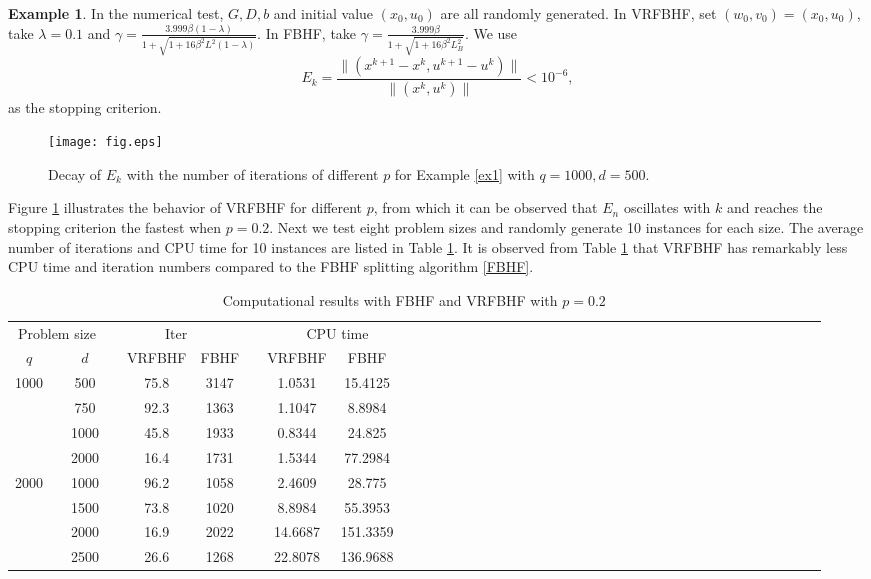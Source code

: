 \documentclass[a4paper,12pt]{article}
\theoremstyle{definition}
\newtheorem{exm}[dfn]{Example}
\begin{document}
\begin{exm}
In the numerical test,  $G,D,b$ and initial value $(x_{0},u_{0})$  are all randomly generated. In VRFBHF, set  $(w_{0},v_{0})=(x_{0},u_{0})$, take $\lambda=0.1$ and $\gamma=\frac{3.999\beta(1-\lambda)}{1+\sqrt{1+16 \beta^2L^2(1-\lambda)}}$. In FBHF, take $\gamma =\frac{3.999 \beta}{1+\sqrt{1+16\beta^2L_B^2}}$. We use
$$
E_k=\frac{\|(x^{k+1}-x^k,u^{k+1}-u^k)\|}{\|(x^k,u^k)\|}<10^{-6},
$$
as the stopping criterion.

\begin{figure}[!h]
\centering
\texttt{[image: fig.eps]}
\caption{Decay of $E_k$ with the number of iterations of different $p$ for
Example \ref{ex1} with $q=1000,d=500$.}
\label{fig2}
\end{figure}

Figure \ref{fig2} illustrates the behavior of VRFBHF for different $p$, from which it can be observed  that $E_n$ oscillates with $k$ and reaches the stopping criterion the fastest when $p=0.2$.
Next we test eight problem sizes and randomly generate 10 instances for each size. The average number of iterations and CPU time for 10 instances are listed in Table \ref{table1}. It is observed from Table \ref{table1} that VRFBHF has remarkably less CPU time and iteration numbers compared to the FBHF splitting algorithm \eqref{FBHF}.



\begin{table}[h]
\label{table1}
\small
\renewcommand\arraystretch{2.8}
\centering
\caption{Computational results  with FBHF and VRFBHF with $p=0.2$}
\vskip 2mm
\begin{tabular}{ccccccccccccccccccccccccccccccccccccccc}
\hline
\multicolumn{3}{c}{Problem size}  & \multicolumn{3}{c}{Iter} &&
 \multicolumn{3}{c}{CPU time}  \\
\cline{1-3} \cline{5-6} \cline{8-10}

$q$ && $d$ &&  VRFBHF  & FBHF  &&  VRFBHF&FBHF&   \\
\hline
 \hline
 \multirow{4}{*}{1000}&&500&&75.8&3147&&1.0531&15.4125&\\
 \cline{2-10}
&&750&&92.3&1363&&1.1047&8.8984&\\
\cline{2-10}
&&1000&&45.8&1933&&0.8344&24.825&\\
\cline{2-10}
&&2000&&16.4&1731&&1.5344&77.2984&\\
\hline
\multirow{4}{*}{2000}&&1000&&96.2&1058&&2.4609&28.775&\\
\cline{2-10}
&&1500&&73.8&1020&&8.8984&55.3953&\\
\cline{2-10}
&&2000&&16.9&2022&&14.6687&151.3359&\\
\cline{2-10}
&&2500&&26.6&1268&&22.8078&136.9688&\\
\hline
\hline
\end{tabular}
\label{table1}
\end{table}


\end{exm}
\end{document}
